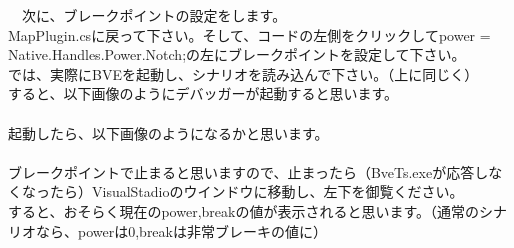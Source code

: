 \documentclass[b5paper,9pt,platex,dvipdfmx]{jsarticle}
\begin{document}
\begin{multicols*}{3}
　次に、ブレークポイントの設定をします。\\
MapPlugin.csに戻って下さい。そして、コードの左側をクリックしてpower = Native.Handles.Power.Notch;の左にブレークポイントを設定して下さい。\\
では、実際にBVEを起動し、シナリオを読み込んで下さい。（上に同じく）\\
すると、以下画像のようにデバッガーが起動すると思います。\\
\\
起動したら、以下画像のようになるかと思います。\\
\\
ブレークポイントで止まると思いますので、止まったら（BveTs.exeが応答しなくなったら）VisualStadioのウインドウに移動し、左下を御覧ください。\\
すると、おそらく現在のpower,breakの値が表示されると思います。（通常のシナリオなら、powerは0,breakは非常ブレーキの値に）




\end{multicols*}
\end{document}
